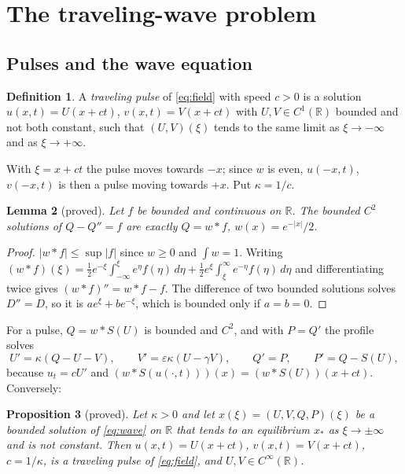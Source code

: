 \documentclass[11pt]{article}
\newtheorem{lemma}{Lemma}[section]
\newtheorem{proposition}[lemma]{Proposition}
\theoremstyle{definition}
\newtheorem{definition}[lemma]{Definition}
\newcommand{\R}{\mathbb{R}}
\newcommand{\eps}{\varepsilon}
\newcommand{\xs}{x_*}
\begin{document}
\section{The traveling-wave problem}\label{sec:setting}

\subsection{Pulses and the wave equation}

\begin{definition}\label{def:pulse}
A \emph{traveling pulse} of \eqref{eq:field} with speed $c > 0$ is a solution $u(x, t) = U(x + ct)$, $v(x, t) = V(x + ct)$ with $U, V \in C^1(\R)$ bounded and not both constant, such that $(U, V)(\xi)$ tends to the same limit as $\xi \to -\infty$ and as $\xi \to +\infty$.
\end{definition}

With $\xi = x + ct$ the pulse moves towards $-x$; since $w$ is even, $u(-x, t)$, $v(-x, t)$ is then a pulse moving towards $+x$. Put $\kappa = 1/c$.

\begin{lemma}[proved]\label{lem:green}
Let $f$ be bounded and continuous on $\R$. The bounded $C^2$ solutions of $Q - Q'' = f$ are exactly $Q = w * f$, $w(x) = e^{-|x|}/2$.
\end{lemma}

\begin{proof}
$|w * f| \le \sup|f|$ since $w \ge 0$ and $\int w = 1$. Writing $(w * f)(\xi) = \frac12 e^{-\xi}\int_{-\infty}^{\xi} e^{\eta} f(\eta)\, d\eta + \frac12 e^{\xi}\int_{\xi}^{\infty} e^{-\eta} f(\eta)\, d\eta$ and differentiating twice gives $(w * f)'' = w * f - f$. The difference of two bounded solutions solves $D'' = D$, so it is $a e^{\xi} + b e^{-\xi}$, which is bounded only if $a = b = 0$.
\end{proof}

For a pulse, $Q = w * S(U)$ is bounded and $C^2$, and with $P = Q'$ the profile solves
\begin{equation}\label{eq:wave}
  U' = \kappa(Q - U - V), \qquad V' = \eps\kappa(U - \gamma V), \qquad Q' = P, \qquad P' = Q - S(U),
\end{equation}
because $u_t = cU'$ and $(w * S(u(\cdot, t)))(x) = (w * S(U))(x + ct)$. Conversely:

\begin{proposition}[proved]\label{prop:reduction}
Let $\kappa > 0$ and let $x(\xi) = (U, V, Q, P)(\xi)$ be a bounded solution of \eqref{eq:wave} on $\R$ that tends to an equilibrium $\xs$ as $\xi \to \pm\infty$ and is not constant. Then $u(x, t) = U(x + ct)$, $v(x, t) = V(x + ct)$, $c = 1/\kappa$, is a traveling pulse of \eqref{eq:field}, and $U, V \in C^\infty(\R)$.
\end{proposition}
\end{document}
